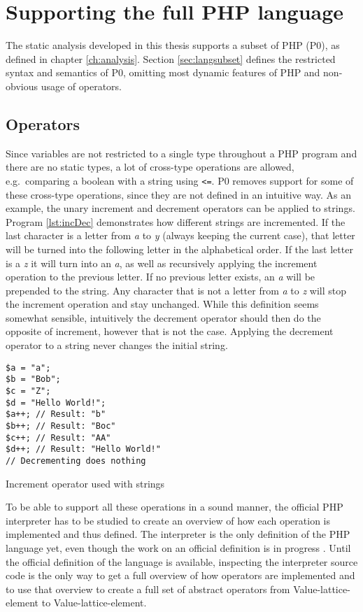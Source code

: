 \section{Supporting the full PHP language}
\label{sec:future1}
The static analysis developed in this thesis supports a subset of PHP (P0), as defined in chapter \ref{ch:analysis}. Section \ref{sec:langsubset} defines the restricted syntax and semantics of P0, omitting most dynamic features of PHP and non-obvious usage of operators. 

\subsection{Operators}
Since variables are not restricted to a single type throughout a PHP program and there are no static types, a lot of cross-type operations are allowed, e.g.\ comparing a boolean with a string using \texttt{<=}. P0 removes support for some of these cross-type operations, since they are not defined in an intuitive way. As an example, the unary increment and decrement operators can be applied to strings. Program \ref{lst:incDec} demonstrates how different strings are incremented. If the last character is a letter from \emph{a} to \emph{y} (always keeping the current case), that letter will be turned into the following letter in the alphabetical order. If the last letter is a \emph{z} it will turn into an \emph{a}, as well as recursively applying the increment operation to the previous letter. If no previous letter exists, an \emph{a} will be prepended to the string. Any character that is not a letter from \emph{a} to \emph{z} will stop the increment operation and stay unchanged. While this definition seems somewhat sensible, intuitively the decrement operator should then do the opposite of increment, however that is not the case. Applying the decrement operator to a string never changes the initial string.

\begin{program}
\begin{lstlisting}
$a = "a";
$b = "Bob";
$c = "Z";
$d = "Hello World!";
$a++; // Result: "b"
$b++; // Result: "Boc"
$c++; // Result: "AA"
$d++; // Result: "Hello World!"
// Decrementing does nothing
\end{lstlisting}
\caption{Increment operator used with strings}
\label{lst:incDec}
\end{program}

To be able to support all these operations in a sound manner, the official PHP interpreter has to be studied to create an overview of how each operation is implemented and thus defined. The interpreter is the only definition of the PHP language yet, even though the work on an official definition is in progress . Until the official definition of the language is available, inspecting the interpreter source code is the only way to get a full overview of how operators are implemented and to use that overview to create a full set of abstract operators from Value-lattice-element to Value-lattice-element.



